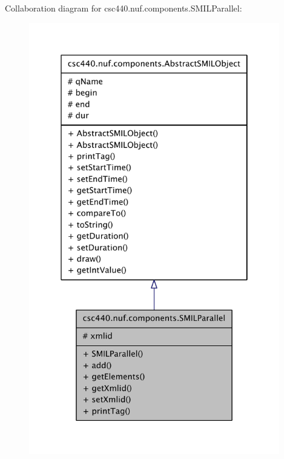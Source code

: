Collaboration diagram for csc440.\-nuf.\-components.\-S\-M\-I\-L\-Parallel\-:
\nopagebreak
\begin{figure}[H]
\begin{center}
\leavevmode
\includegraphics[width=310pt]{classcsc440_1_1nuf_1_1components_1_1_s_m_i_l_parallel__coll__graph}
\end{center}
\end{figure}
